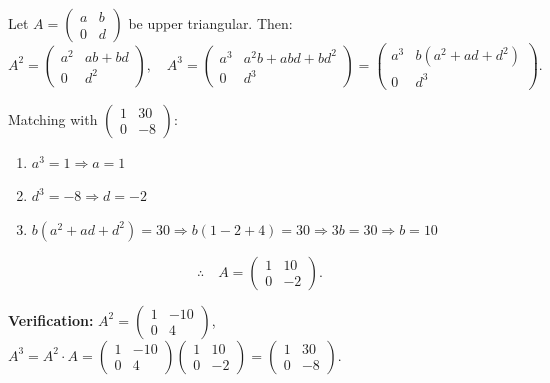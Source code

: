 \documentclass[12pt,a3paper]{article}
\begin{document}
\begin{tcolorbox}[enhanced,breakable,
  colback=cA!4,colframe=cA,boxrule=0.8pt,arc=5pt,
  title={\textbf{Answer --- Upper Triangular $A$ such that $A^3 = \begin{pmatrix}1&30\\0&-8\end{pmatrix}$}},
  fonttitle=\bfseries\color{white},colbacktitle=cA]
 
Let $A = \begin{pmatrix}a & b \\ 0 & d\end{pmatrix}$ be upper triangular. Then:
\[
A^2 = \begin{pmatrix}a^2 & ab+bd \\ 0 & d^2\end{pmatrix},\quad
A^3 = \begin{pmatrix}a^3 & a^2 b + abd + bd^2 \\ 0 & d^3\end{pmatrix}
     = \begin{pmatrix}a^3 & b(a^2+ad+d^2) \\ 0 & d^3\end{pmatrix}.
\]
 
Matching with $\begin{pmatrix}1&30\\0&-8\end{pmatrix}$:
 
\begin{enumerate}[label=\textbf{\arabic*.}]
  \item $a^3 = 1 \Rightarrow a = 1$
  \item $d^3 = -8 \Rightarrow d = -2$
  \item $b(a^2 + ad + d^2) = 30 \Rightarrow b(1 - 2 + 4) = 30 \Rightarrow 3b = 30 \Rightarrow b = 10$
\end{enumerate}
 
\[
\therefore\quad A = \begin{pmatrix}1 & 10 \\ 0 & -2\end{pmatrix}.
\]
 
\textbf{Verification:}
$A^2 = \begin{pmatrix}1&-10\\0&4\end{pmatrix}$,\quad
$A^3 = A^2 \cdot A = \begin{pmatrix}1&-10\\0&4\end{pmatrix}\begin{pmatrix}1&10\\0&-2\end{pmatrix} = \begin{pmatrix}1&30\\0&-8\end{pmatrix}$. \checkmark
 
\end{tcolorbox}
 
\end{document}
